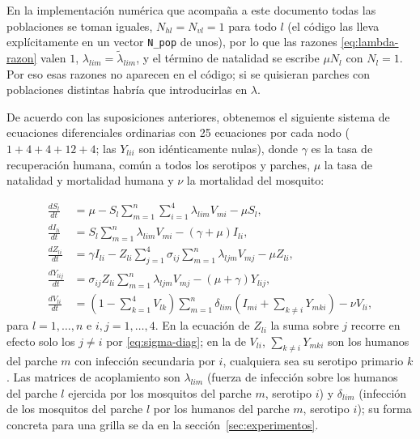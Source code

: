 \documentclass{article}
\numberwithin{equation}{section}
\begin{document}
En la implementación numérica que acompaña a este documento todas las poblaciones se toman iguales, $N_{hl}=N_{vl}=1$ para todo $l$ (el código las lleva explícitamente en un vector \texttt{N\_pop} de unos), por lo que las razones \eqref{eq:lambda-razon} valen $1$, $\lambda_{lim}=\tilde\lambda_{lim}$, y el término de natalidad se escribe $\mu N_l$ con $N_l=1$. Por eso esas razones no aparecen en el código; si se quisieran parches con poblaciones distintas habría que introducirlas en $\lambda$.

De acuerdo con las suposiciones anteriores, obtenemos el siguiente sistema de ecuaciones diferenciales ordinarias con 25 ecuaciones por cada nodo ($1+4+4+12+4$; las $Y_{lii}$ son idénticamente nulas), donde $\gamma$ es la tasa de recuperación humana, común a todos los serotipos y parches, $\mu$ la tasa de natalidad y mortalidad humana y $\nu$ la mortalidad del mosquito:

\begin{equation}\label{eq:sistema}
\begin{aligned}
    \frac{d S_l}{d t} & =\mu-S_l\sum_{m=1}^n\sum_{i=1}^4 \lambda_{lim} V_{mi} -\mu S_l, \\
    \frac{d I_{li}}{d t} & =S_l\sum_{m=1}^n\lambda_{lim} V_{mi} -\left(\gamma+\mu\right) I_{li}, \\
    \frac{d Z_{li}}{d t} & =\gamma I_{li}-Z_{li}\sum_{j=1}^4\sigma_{ij}\sum_{m=1}^n  \lambda_{ljm}V_{mj}-\mu Z_{li}, \\
    \frac{d Y_{lij}}{d t} & =\sigma_{ij}Z_{li}\sum_{m=1}^n\lambda_{ljm}V_{mj}-\left(\mu+\gamma\right) Y_{lij}, \\
    \frac{d V_{li}}{d t} & =\left(1-\sum_{k=1}^4 V_{lk}\right)\sum_{m=1}^n\delta_{lim}\left(I_{mi}+\sum_{k\neq i} Y_{mki}\right)-\nu V_{li},
\end{aligned}
\end{equation}
para $l=1,\dots,n$ e $i,j=1,\dots,4$. En la ecuación de $Z_{li}$ la suma sobre $j$ recorre en efecto solo los $j\neq i$ por \eqref{eq:sigma-diag}; en la de $V_{li}$, $\sum_{k\neq i}Y_{mki}$ son los humanos del parche $m$ con infección secundaria por $i$, cualquiera sea su serotipo primario $k$. Las matrices de acoplamiento son $\lambda_{lim}$ (fuerza de infección sobre los humanos del parche $l$ ejercida por los mosquitos del parche $m$, serotipo $i$) y $\delta_{lim}$ (infección de los mosquitos del parche $l$ por los humanos del parche $m$, serotipo $i$); su forma concreta para una grilla se da en la sección~\ref{sec:experimentos}.
\end{document}
